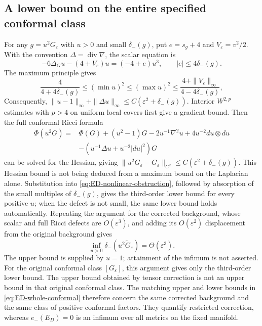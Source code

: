 \documentclass[a4paper,11pt]{article}
\numberwithin{equation}{section}
\theoremstyle{definition}
\begin{document}
\subsection{A lower bound on the entire specified conformal class}\label{sec:ED-conformal}
For any $g=u^2G_\varepsilon$ with $u>0$ and small $\delta_-(g)$,
put $e=s_g+4$ and $V_\varepsilon=v^2/2$.
With the convention $\Delta=\operatorname{div}\nabla$, the scalar equation is
\[
-6\Delta_Gu-(4+V_\varepsilon)u=(-4+e)u^3,\qquad
|e|\le4\delta_-(g).
\]
The maximum principle gives
\[
\frac4{4+4\delta_-(g)}\le(\min u)^2\le(\max u)^2
\le\frac{4+\|V_\varepsilon\|_\infty}{4-4\delta_-(g)},
\]
Consequently, $\|u-1\|_\infty+\|\Delta u\|_\infty
\le C(\varepsilon^2+\delta_-(g))$.
Interior $W^{2,p}$ estimates with $p>4$ on uniform local covers first give a gradient bound.
Then the full conformal Ricci formula
\[
\begin{split}
\Phi(u^2G)={}&\Phi(G)+(u^2-1)G-2u^{-1}\nabla^2u
+4u^{-2}du\otimes du\\
&-(u^{-1}\Delta u+u^{-2}|du|^2)G
\end{split}
\]
can be solved for the Hessian, giving
$\|u^2G_\varepsilon-G_\varepsilon\|_{C^2}
\le C(\varepsilon^2+\delta_-(g))$.
This Hessian bound is not being deduced from a maximum bound on the Laplacian alone.
Substitution into \eqref{eq:ED-nonlinear-obstruction},
followed by absorption of the small multiples of $\delta_-(g)$, gives the third-order lower bound for every positive $u$;
when the defect is not small, the same lower bound holds automatically.
Repeating the argument for the corrected background, whose scalar and full Ricci defects are $O(\varepsilon^3)$,
and adding its $O(\varepsilon^2)$ displacement from the original background gives
\begin{equation}\label{eq:ED-whole-conformal}
\inf_{u>0}\delta_-(u^2\widetilde G_\varepsilon)
=\Theta(\varepsilon^3).
\end{equation}
The upper bound is supplied by $u=1$; attainment of the infimum is not asserted.
For the original conformal class $[G_\varepsilon]$, this argument gives only the third-order lower bound.
The upper bound obtained by tensor correction is not an upper bound in that original conformal class.
The matching upper and lower bounds in \eqref{eq:ED-whole-conformal} therefore concern the same corrected background and the same class of positive conformal factors.
They quantify restricted correction, whereas $e_-(E_D)=0$ is an infimum over all metrics on the fixed manifold.
\end{document}
